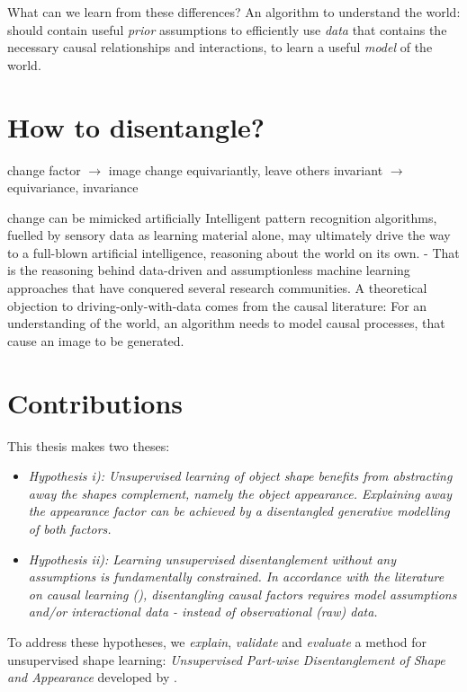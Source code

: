 	What can we learn from these differences? An algorithm to understand the world: should contain useful \textit{prior} assumptions to efficiently use \textit{data} that contains the necessary causal relationships and interactions, to learn a useful \textit{model} of the world.



\section{How to disentangle?}
	change factor $\rightarrow$  image change equivariantly, leave others invariant
	$\rightarrow$  equivariance, invariance

	change can be mimicked artificially
	Intelligent pattern recognition algorithms, fuelled by sensory data as learning material alone, may ultimately drive the way to a full-blown artificial intelligence, reasoning about the world on its own. - That is the reasoning behind data-driven and assumptionless machine learning approaches that have conquered several research communities.
	A theoretical objection to driving-only-with-data comes from the causal literature: For an understanding of the world, an algorithm needs to model causal processes, that cause an image to be generated.

\section{Contributions}
	This thesis makes two theses:
	\begin{itemize}
		\item  \textit{Hypothesis \emph{i)}: Unsupervised learning of object shape benefits from abstracting away the shapes complement, namely the object appearance. Explaining away the appearance factor can be achieved by a disentangled generative modelling of both factors.}
		\item \textit{Hypothesis \emph{ii)}: Learning unsupervised disentanglement without any assumptions is fundamentally constrained. In accordance with the literature on causal learning (\cite{pearl18impediments}), disentangling causal factors requires model assumptions and/or interactional data - instead of observational (raw) data.}
	\end{itemize}
	To address these hypotheses, we \textit{explain}, \textit{validate} and \textit{evaluate} a method for unsupervised shape learning: \textit{Unsupervised Part-wise Disentanglement of Shape and Appearance} developed by .


